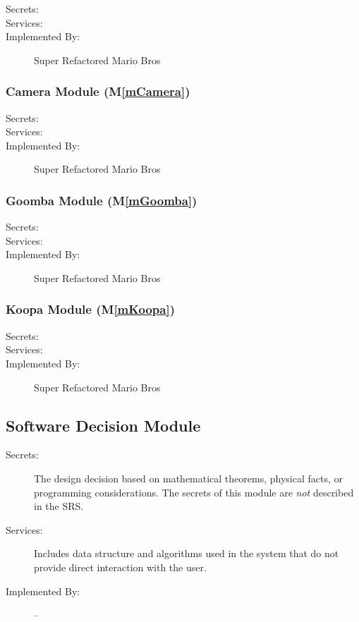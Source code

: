 \documentclass[12pt, titlepage]{article}
\newcommand{\mref}[1]{M\ref{#1}}
\begin{document}
\begin{description}
\item[Secrets:] 
\item[Services:] 
\item[Implemented By:] Super Refactored Mario Bros
\end{description}

\subsubsection{Camera Module (\mref{mCamera})}

\begin{description}
\item[Secrets:] 
\item[Services:] 
\item[Implemented By:] Super Refactored Mario Bros
\end{description}

\subsubsection{Goomba Module (\mref{mGoomba})}

\begin{description}
\item[Secrets:] 
\item[Services:] 
\item[Implemented By:] Super Refactored Mario Bros
\end{description}

\subsubsection{Koopa Module (\mref{mKoopa})}

\begin{description}
\item[Secrets:] 
\item[Services:] 
\item[Implemented By:] Super Refactored Mario Bros
\end{description}

\subsection{Software Decision Module}

\begin{description}
\item[Secrets:] The design decision based on mathematical theorems, physical
  facts, or programming considerations. The secrets of this module are
  \emph{not} described in the SRS.
\item[Services:] Includes data structure and algorithms used in the system that
  do not provide direct interaction with the user. 
\item[Implemented By:] --
\end{description}
\end{document}
